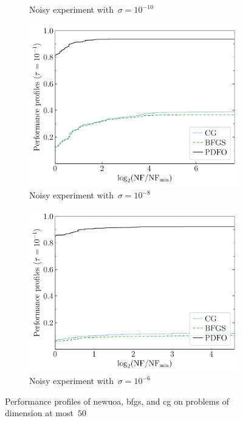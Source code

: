 \documentclass[
    smallextended,  %
    final,        %
]{svjour3}
\begin{document}
\begin{figure}[ht]
\begin{subfigure}{.48\textwidth}
        \caption{Noisy experiment with~$\sigma = 10^{-10}$}
    \end{subfigure}
    \begin{subfigure}{.48\textwidth}
        \centering
        \includegraphics[width=\textwidth]{perf-noisy-bfgs_cg_pdfo-50-8.pdf}
        \caption{Noisy experiment with~$\sigma = 10^{-8}$}
    \end{subfigure}
    \hfill
    \begin{subfigure}{.48\textwidth}
        \centering
        \includegraphics[width=\textwidth]{perf-noisy-bfgs_cg_pdfo-50-6.pdf}
        \caption{Noisy experiment with~$\sigma = 10^{-6}$}
        \label{fig:ppu-fdiff-noisy-6}
    \end{subfigure}
    \caption{Performance profiles of \gls{newuoa}, \gls{bfgs}, and \gls{cg} on problems of dimension at most~$50$}
\end{figure}
\end{document}
